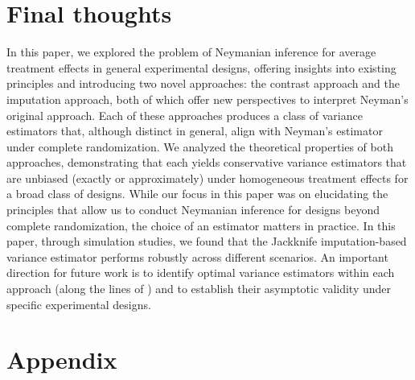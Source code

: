 \documentclass[12pt]{article}
\begin{document}
\section{Final thoughts}
\label{sec_final}

In this paper, we explored the problem of Neymanian inference for average treatment effects in general experimental designs, offering insights into existing principles and introducing two novel approaches: the contrast approach and the imputation approach, both of which offer new perspectives to interpret Neyman's original approach. Each of these approaches produces a class of variance estimators that, although distinct in general, align with Neyman's estimator under complete randomization.
We analyzed the theoretical properties of both approaches, demonstrating that each yields conservative variance estimators that are unbiased (exactly or approximately) under homogeneous treatment effects for a broad class of designs.
While our focus in this paper was on elucidating the principles that allow us to conduct Neymanian inference for designs beyond complete randomization, the choice of an estimator matters in practice. In this paper, through simulation studies, we found that the Jackknife imputation-based variance estimator performs robustly across different scenarios.
An important direction for future work is to identify optimal variance estimators within each approach (along the lines of \cite{harshaw2021optimized}) and to establish their asymptotic validity under specific experimental designs.




\newpage
\appendix

\section*{Appendix}



\def\thesection{\Alph{section}}
\renewcommand*{\thetheorem}{\Alph{section}\arabic{theorem}}
\renewcommand*{\thelemma}{\Alph{section}\arabic{lemma}}
\end{document}

